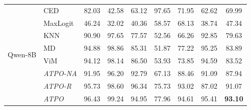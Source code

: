\begin{table}[t!]
{\begin{tabular}{|c|l|ccccccc|}
\multirow{8}{*}{Qwen-8B}     &  CED                    &   82.03  &   42.58  &   63.12  &   97.65  &   71.95  &   62.62  &   \multicolumn{1}{|c|}{69.99}  \\
                             &  MaxLogit                    &   46.24  &   32.02  &   40.36  &   58.57  &   68.13  &   38.74  &   \multicolumn{1}{|c|}{47.34}  \\ 
                             &  KNN                    &   90.90  &   97.65  &   77.57  &   52.56  &   66.26  &   92.85  &   \multicolumn{1}{|c|}{79.63}  \\ 
                             &  MD                     &   94.88  &   98.86  &   85.31  &   51.87  &   77.22  &   95.25  &   \multicolumn{1}{|c|}{83.89}  \\ 
                             &  ViM                    &   94.12  &   98.14  &   86.50  &   53.93  &   73.85  &   94.59  &   \multicolumn{1}{|c|}{83.52}  \\ %
                             &  \cellcolor{rowGray} \textit{ATPO-NA}  &  \cellcolor{rowGray} 91.95  &  \cellcolor{rowGray} 96.20  &  \cellcolor{rowGray} 92.79  & \cellcolor{rowGray}  67.13  & \cellcolor{rowGray}  88.46  &  \cellcolor{rowGray} 91.09  &   \multicolumn{1}{|c|}{\cellcolor{rowGray} 87.94}  \\ %
                             &  \cellcolor{rowGray} \textit{ATPO-R}  &  \cellcolor{rowGray} 95.73  &  \cellcolor{rowGray} 98.60  &  \cellcolor{rowGray} 96.34  & \cellcolor{rowGray}  75.73  & \cellcolor{rowGray}  93.02  &  \cellcolor{rowGray} 87.02  &   \multicolumn{1}{|c|}{\cellcolor{rowGray} 91.07}  \\ 
                            &  \cellcolor{rowGray} \textit{ATPO}  &  \cellcolor{rowGray} 96.43  & \cellcolor{rowGray} 99.24  &  \cellcolor{rowGray} 94.95  & \cellcolor{rowGray} 77.96  & \cellcolor{rowGray} 94.61  &  \cellcolor{rowGray} 95.41  &  \multicolumn{1}{|c|}{\cellcolor{rowGray} \textbf{93.10}}  \\  \hline

\end{tabular}}
\end{table}
